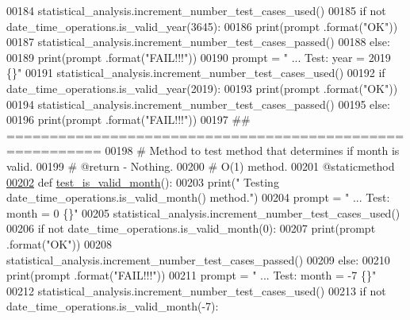 \begin{DoxyCode}
00184         statistical\_analysis.increment\_number\_test\_cases\_used()
00185         \textcolor{keywordflow}{if} \textcolor{keywordflow}{not} date\_time\_operations.is\_valid\_year(3645):
00186             print(prompt .format(\textcolor{stringliteral}{"OK"}))
00187             statistical\_analysis.increment\_number\_test\_cases\_passed()
00188         \textcolor{keywordflow}{else}:
00189             print(prompt .format(\textcolor{stringliteral}{"FAIL!!!"}))
00190         prompt = \textcolor{stringliteral}{"  ... Test: year = 2019                   \{\}"}
00191         statistical\_analysis.increment\_number\_test\_cases\_used()
00192         \textcolor{keywordflow}{if} date\_time\_operations.is\_valid\_year(2019):
00193             print(prompt .format(\textcolor{stringliteral}{"OK"}))
00194             statistical\_analysis.increment\_number\_test\_cases\_passed()
00195         \textcolor{keywordflow}{else}:
00196             print(prompt .format(\textcolor{stringliteral}{"FAIL!!!"}))
00197     \textcolor{comment}{## =========================================================}
00198     \textcolor{comment}{#   Method to test method that determines if month is valid.}
00199     \textcolor{comment}{#   @return - Nothing.}
00200     \textcolor{comment}{#   O(1) method.}
00201     @staticmethod
\hypertarget{date__time__processing__tester_8py_source_l00202}{}\hyperlink{classutilities_1_1date__time__processing__tester_1_1date__time__operations__tester_ae3d0fc5e01b44ebe36ef28464f1f755a}{00202}     \textcolor{keyword}{def }\hyperlink{classutilities_1_1date__time__processing__tester_1_1date__time__operations__tester_ae3d0fc5e01b44ebe36ef28464f1f755a}{test\_is\_valid\_month}():
00203         print(\textcolor{stringliteral}{" Testing date\_time\_operations.is\_valid\_month() method."})
00204         prompt = \textcolor{stringliteral}{"  ... Test: month = 0                 \{\}"}
00205         statistical\_analysis.increment\_number\_test\_cases\_used()
00206         \textcolor{keywordflow}{if} \textcolor{keywordflow}{not} date\_time\_operations.is\_valid\_month(0):
00207             print(prompt .format(\textcolor{stringliteral}{"OK"}))
00208             statistical\_analysis.increment\_number\_test\_cases\_passed()
00209         \textcolor{keywordflow}{else}:
00210             print(prompt .format(\textcolor{stringliteral}{"FAIL!!!"}))
00211         prompt = \textcolor{stringliteral}{"  ... Test: month = -7                    \{\}"}
00212         statistical\_analysis.increment\_number\_test\_cases\_used()
00213         \textcolor{keywordflow}{if} \textcolor{keywordflow}{not} date\_time\_operations.is\_valid\_month(-7):

\end{DoxyCode}
